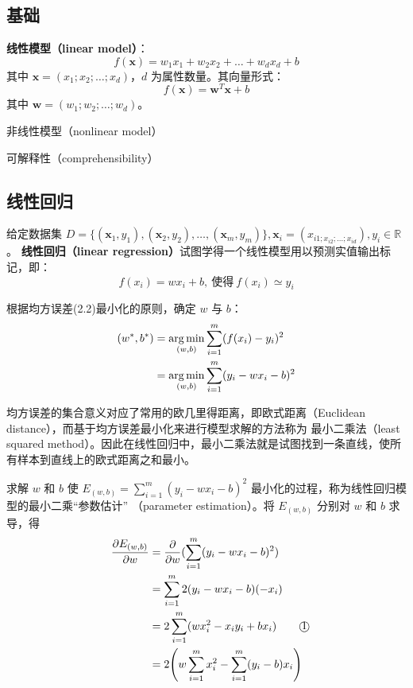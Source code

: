 \documentclass[../studies-ml.tex]{subfiles}
\begin{document}
\subsection{基础}

\textbf{线性模型（linear model）}：
\begin{equation}
  f(\pmb{x}) = w_1x_1 + w_2x_2 + \dots + w_d x_d + b
\end{equation}
其中 $\pmb{x} = (x_1;x_2;\dots;x_d)$，$d$ 为属性数量。其向量形式：
\begin{equation}
  f(\pmb{x}) = \pmb{w}^T\pmb{x} + b
\end{equation}
其中 $\pmb{w} = (w_1;w_2;\dots;w_d)$。

非线性模型（nonlinear model）

可解释性（comprehensibility）

\subsection{线性回归}

给定数据集 $D = \{(\pmb{x}_1,y_1), (\pmb{x}_2,y_2),\dots,(\pmb{x}_m,y_m)\}, \pmb{x}_i = (x_{i1;x_{i2};\dots;x_{id}}), y_i \in \mathbb{R}$。
\textbf{线性回归（linear regression）}试图学得一个线性模型用以预测实值输出标记，即：
\begin{equation}
  f(x_i) = wx_i + b,\ \text{使得}\ f(x_i) \simeq y_i
\end{equation}

根据均方误差(2.2)最小化的原则，确定 $w$ 与 $b$：
\begin{equation}
  \begin{split}
    (w^*, b^*) & = \operatorname*{\arg\min}_{(w,b)} \sum_{i=1}^{m} (f(x_i) - y_i)^2 \\
    & = \operatorname*{\arg\min}_{(w,b)} \sum_{i=1}^{m} (y_i - wx_i - b)^2
  \end{split}
\end{equation}

均方误差的集合意义对应了常用的欧几里得距离，即欧式距离（Euclidean distance），而基于均方误差最小化来进行模型求解的方法称为
最小二乘法（least squared method）。因此在线性回归中，最小二乘法就是试图找到一条直线，使所有样本到直线上的欧式距离之和最小。

求解 $w$ 和 $b$ 使 $E_{(w,b)} = \sum_{i=1}^{m} (y_i - wx_i - b)^2$ 最小化的过程，称为线性回归模型的最小二乘“参数估计”
（parameter estimation）。将 $E_{(w,b)}$ 分别对 $w$ 和 $b$ 求导，得
\begin{equation}
  \begin{split}
    \frac{\partial E_{(w,b)}}{\partial w} & = \frac{\partial}{\partial w}(\sum_{i=1}^{m} (y_i - wx_i - b)^2)                     \\
    & = \sum_{i=1}^{m} 2(y_i - wx_i - b)(-x_i)                                             \\
    & = 2 \sum_{i=1}^{m} (wx_i^2 - x_i y_i + bx_i) \makebox[2em][l]{\qquad\textcircled{1}} \\
    & = 2 \Biggl(w\sum_{i=1}^{m} x_i^2 - \sum_{i=1}^{m} (y_i - b)x_i \Biggr)
  \end{split}
\end{equation}
\end{document}
